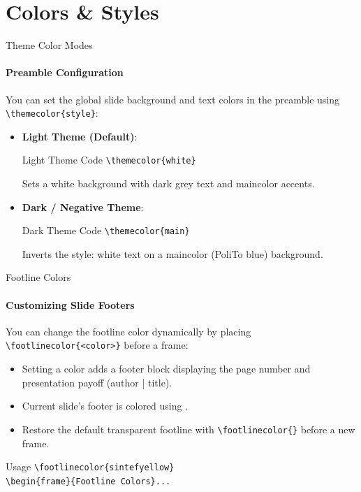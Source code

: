 
\section{Colors \& Styles}

\begin{frame}[fragile]{Theme Color Modes}
\framesubtitle{Preamble Configuration}
You can set the global slide background and text colors in the preamble using \verb|\themecolor{style}|:
\begin{itemize}
    \item \textbf{Light Theme (Default)}:
    \begin{block}{Light Theme Code}
    \verb|\themecolor{white}|
    \end{block}
    Sets a white background with dark grey text and maincolor accents.
    \item \textbf{Dark / Negative Theme}:
    \begin{block}{Dark Theme Code}
    \verb|\themecolor{main}|
    \end{block}
    Inverts the style: white text on a maincolor (PoliTo blue) background.
\end{itemize}
\end{frame}

\begin{frame}[fragile]{Footline Colors}
\framesubtitle{Customizing Slide Footers}
You can change the footline color dynamically by placing \verb|\footlinecolor{<color>}| before a frame:
\begin{itemize}
    \item Setting a color adds a footer block displaying the page number and presentation payoff (author | title).
    \item Current slide's footer is colored using .
    \item Restore the default transparent footline with \verb|\footlinecolor{}| before a new frame.
\end{itemize}
\begin{block}{Usage}
\verb|\footlinecolor{sintefyellow}| \\
\verb|\begin{frame}{Footline Colors}...|
\end{block}
\end{frame}

